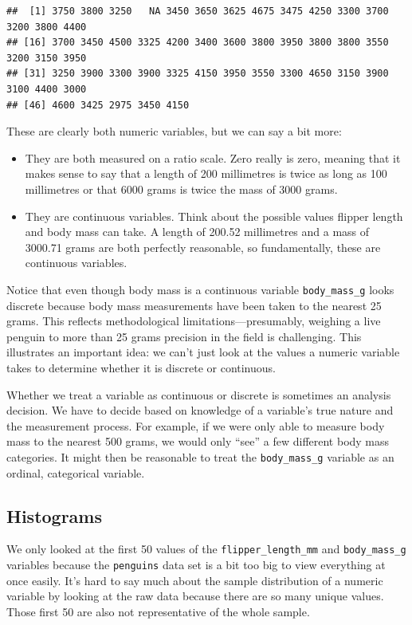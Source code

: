 \documentclass[
]{book}
\providecommand{\tightlist}{%
  \setlength{\itemsep}{0pt}\setlength{\parskip}{0pt}}
\begin{document}
\begin{verbatim}
##  [1] 3750 3800 3250   NA 3450 3650 3625 4675 3475 4250 3300 3700 3200 3800 4400
## [16] 3700 3450 4500 3325 4200 3400 3600 3800 3950 3800 3800 3550 3200 3150 3950
## [31] 3250 3900 3300 3900 3325 4150 3950 3550 3300 4650 3150 3900 3100 4400 3000
## [46] 4600 3425 2975 3450 4150
\end{verbatim}

These are clearly both numeric variables, but we can say a bit more:

\begin{itemize}
\tightlist
\item
  They are both measured on a ratio scale. Zero really is zero, meaning that it makes sense to say that a length of 200 millimetres is twice as long as 100 millimetres or that 6000 grams is twice the mass of 3000 grams.
\item
  They are continuous variables. Think about the possible values flipper length and body mass can take. A length of 200.52 millimetres and a mass of 3000.71 grams are both perfectly reasonable, so fundamentally, these are continuous variables.
\end{itemize}

Notice that even though body mass is a continuous variable \texttt{body\_mass\_g} looks discrete because body mass measurements have been taken to the nearest 25 grams. This reflects methodological limitations---presumably, weighing a live penguin to more than 25 grams precision in the field is challenging. This illustrates an important idea: we can't just look at the values a numeric variable takes to determine whether it is discrete or continuous.

Whether we treat a variable as continuous or discrete is sometimes an analysis decision. We have to decide based on knowledge of a variable's true nature and the measurement process. For example, if we were only able to measure body mass to the nearest 500 grams, we would only ``see'' a few different body mass categories. It might then be reasonable to treat the \texttt{body\_mass\_g} variable as an ordinal, categorical variable.

\hypertarget{histograms}{%
\subsection{Histograms}\label{histograms}}

We only looked at the first 50 values of the \texttt{flipper\_length\_mm} and \texttt{body\_mass\_g} variables because the \texttt{penguins} data set is a bit too big to view everything at once easily. It's hard to say much about the sample distribution of a numeric variable by looking at the raw data because there are so many unique values. Those first 50 are also not representative of the whole sample.
\end{document}
